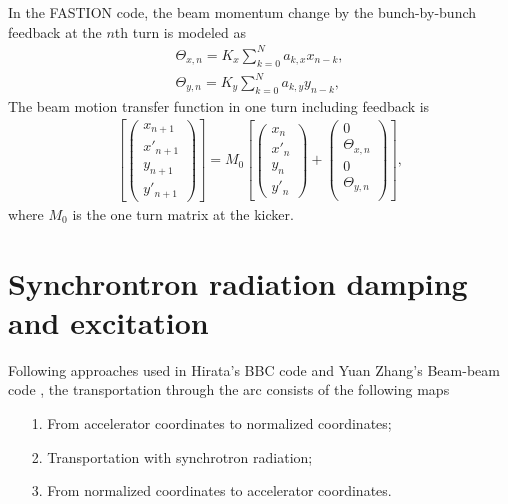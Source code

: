 \documentclass[aps,prab,reprint,superscriptaddress,showpacs,showkeys,letter]{revtex4-1}
\begin{document}
In the FASTION code, the beam momentum change by the bunch-by-bunch feedback at the $n$th turn is modeled as 
\begin{eqnarray}\label{eq3.5}
\Theta_{x,n}= K_x \sum_{k=0}^{N}a_{k,x} x_{n-k}, \nonumber  \\
\Theta_{y,n}= K_y \sum_{k=0}^{N}a_{k,y} y_{n-k},
\end{eqnarray}
The  beam motion transfer function in one turn including feedback is 
\begin{eqnarray}\label{eq3.6}
 { 
 \left[
 \left( 
 \begin{array}{c} 
 x_{n+1}  \\ 
 x'_{n+1}  \\
  y_{n+1}  \\ 
 y'_{n+1}  
 \end{array} 
 \right)
 \right ]}
 =M_0{ 
 \left[
 \left(  
 \begin{array}{cc} 
 x_{n}  \\ 
 x'_{n}  \\
  y_{n}  \\ 
 y'_{n}  
 \end{array}
  \right)
 +  
 \left(  
 \begin{array}{cc} 
 0  \\ 
 \Theta_{x,n} \\
 0  \\ 
 \Theta_{y,n} \\ 
 \end{array}
   \right)
 \right ]},
\end{eqnarray}
 where $M_0$ is the one turn matrix at the  kicker.


\section{Synchrontron radiation damping and excitation}
Following approaches used in Hirata’s BBC code and Yuan Zhang's Beam-beam code , the transportation through the arc consists of the following maps
\begin{itemize}
\item[1. ] From accelerator coordinates to normalized coordinates; 
\item[2. ] Transportation with synchrotron radiation; 
\item[3. ] From normalized coordinates to accelerator coordinates.
\end{itemize}
\end{document}
